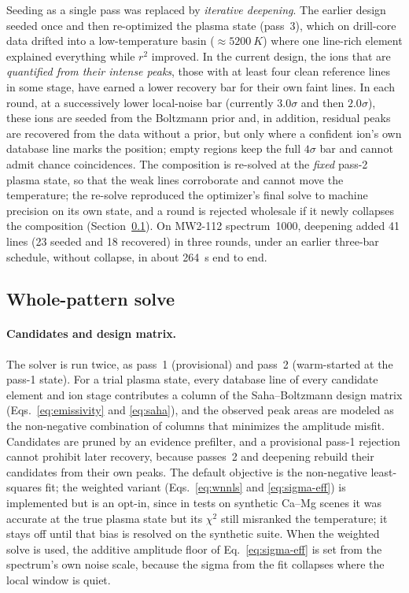 Seeding as a single pass was replaced by \emph{iterative deepening}.
The earlier design seeded once and then re-optimized the plasma state (pass~3), which on drill-core data drifted into a low-temperature basin ($\approx\SI{5200}{K}$) where one line-rich element explained everything while $r^2$ improved.
In the current design, the ions that are \emph{quantified from their intense peaks}, those
with at least four clean reference lines in some stage, have earned a lower
recovery bar for their own faint lines.
In each round, at a successively lower local-noise bar (currently $3.0\sigma$ and then $2.0\sigma$),
these ions are seeded from the Boltzmann prior and, in addition, residual peaks are
recovered from the data without a prior, but only where a confident ion's own database line
marks the position; empty regions keep the full $4\sigma$ bar and cannot admit chance
coincidences.
The composition is re-solved at the \emph{fixed} pass-2 plasma state, so that the weak lines
corroborate and cannot move the temperature; the re-solve reproduced the optimizer's final
solve to machine precision on its own state, and a round is rejected wholesale if it newly
collapses the composition (Section~\ref{sec:wf-solve}).
On MW2-112 spectrum~1000, deepening added 41 lines (23 seeded and 18 recovered) in three
rounds, under an earlier three-bar schedule, without collapse, in about \SI{264}{s} end to end.

\subsection{Whole-pattern solve}
\label{sec:wf-solve}

\paragraph{Candidates and design matrix.}
The solver is run twice, as pass~1 (provisional) and pass~2 (warm-started at the pass-1
state).
For a trial plasma state, every database line of every candidate element and ion stage
contributes a column of the Saha--Boltzmann design matrix (Eqs.~\eqref{eq:emissivity} and
\eqref{eq:saha}), and the observed peak areas are modeled as the non-negative combination
of columns that minimizes the amplitude misfit.
Candidates are pruned by an evidence prefilter, and a provisional pass-1 rejection cannot
prohibit later recovery, because passes~2 and deepening rebuild their candidates from their
own peaks.
The default objective is the non-negative least-squares fit; the weighted variant
(Eqs.~\eqref{eq:wnnls} and \eqref{eq:sigma-eff}) is implemented but is an opt-in, since in
tests on synthetic Ca--Mg scenes it was accurate at the true plasma state but its $\chi^2$
still misranked the temperature; it stays off until that bias is resolved on the synthetic suite.
When the weighted solve is used, the additive amplitude floor of Eq.~\eqref{eq:sigma-eff} is
set from the spectrum's own noise scale, because the sigma from the fit collapses where
the local window is quiet.

